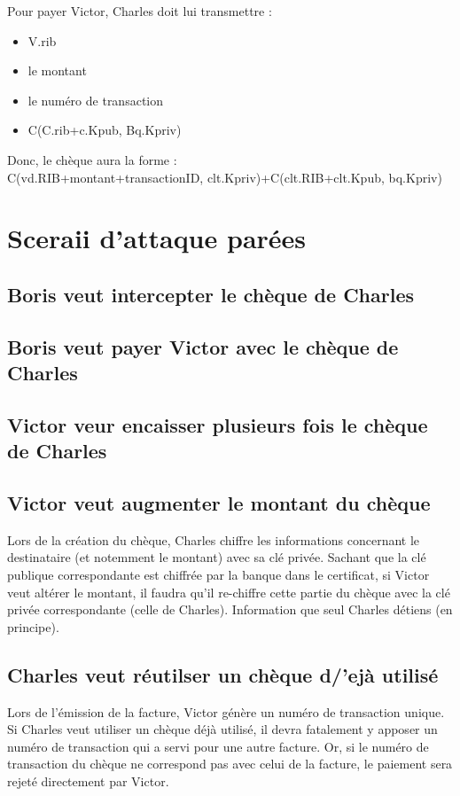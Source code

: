 \documentclass[oneside,10pt]{article}
\begin{document}
Pour payer Victor, Charles doit lui transmettre :
\begin{itemize}
\item V.rib
\item le montant
\item le num\'ero de transaction
\item C(C.rib+c.Kpub, Bq.Kpriv)
\end{itemize}
Donc, le ch\`eque aura la forme : \\C(vd.RIB+montant+transactionID, clt.Kpriv)+C(clt.RIB+clt.Kpub, bq.Kpriv)

\section{Sceraii d'attaque par\'ees}
\subsection{Boris veut intercepter le ch\`eque de Charles}

\subsection{Boris veut payer Victor avec le ch\`eque de Charles}

\subsection{Victor veur encaisser plusieurs fois le ch\`eque de Charles}

\subsection{Victor veut augmenter le montant du ch\`eque}
Lors de la cr\'eation du ch\`eque, Charles chiffre les informations concernant le destinataire (et notemment le montant) avec sa cl\'e priv\'ee.
Sachant que la cl\'e publique correspondante est chiffr\'ee par la banque dans le certificat, si Victor veut alt\'erer le montant, il faudra qu'il re-chiffre cette partie du ch\`eque avec la cl\'e priv\'ee correspondante (celle de Charles).
Information que seul Charles d\'etiens (en principe).

\subsection{Charles veut r\'eutilser un ch\`eque d/'ej\`a utilis\'e}
Lors de l'\'emission de la facture, Victor g\'en\`ere un num\'ero de transaction unique.
Si Charles veut utiliser un ch\`eque d\'ej\`a utilis\'e, il devra fatalement y apposer un num\'ero de transaction qui a servi pour une autre facture.
Or, si le num\'ero de transaction du ch\`eque ne correspond pas avec celui de la facture, le paiement sera rejet\'e directement par Victor.
\end{document}
